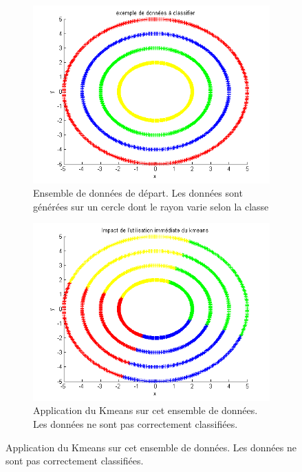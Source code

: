 \begin{figure}[H]
\centering
\begin{subfigure}[t]{0.6\textwidth}
\centering
    \includegraphics[scale=0.6,angle=0]{Images/DataSet.png}
    \caption{Ensemble de données de départ. Les données sont générées sur un cercle dont le rayon varie selon la classe}
    \label{fig:DataSet}
\end{subfigure}
\begin{subfigure}[t]{0.6\textwidth}
\centering
    \includegraphics[scale=0.6,angle=0]{Images/AlgoKmeans.png}
    \caption{Application du Kmeans sur cet ensemble de données. Les données ne sont pas correctement classifiées.}
    \label{fig:AlgoKmeans}
\end{subfigure}
\end{figure}

